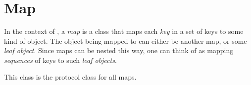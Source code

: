 \chapter{Map}

In the context of \sysname{}, a \emph{map} is a class that maps
each \emph{key} in a set of keys to some kind of object.  The object
being mapped to can either be another map, or some \emph{leaf
  object}.  Since maps can be nested this way, one can think of
\sysname{} as mapping \emph{sequences} of keys to such \emph{leaf
  objects}.


This class is the protocol class for all maps.
